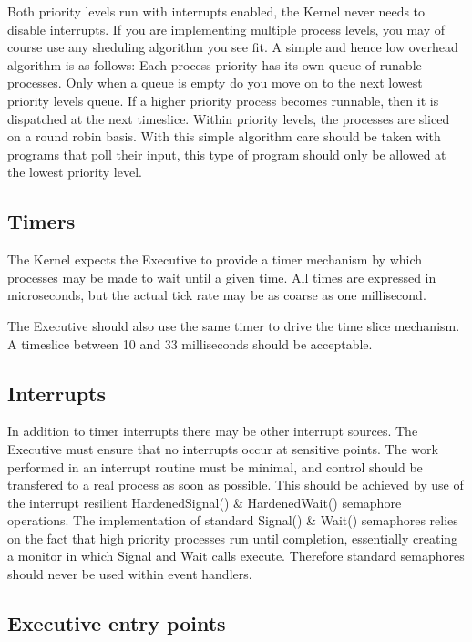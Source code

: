 Both priority levels run with interrupts enabled, the Kernel never
needs to disable interrupts.
If you are implementing multiple process levels, you may of course use
any sheduling algorithm you see fit. A simple and hence low overhead
algorithm is as follows:
Each process priority has its own queue of runable processes. Only when
a queue is empty do you move on to the next lowest priority levels queue.
If a higher priority process becomes runnable, then it is dispatched at
the next timeslice. Within priority levels, the processes are sliced on a
round robin basis.
With this
simple algorithm care should be taken with programs that poll their input,
this type of program should only be allowed at the lowest priority level.

\subsection{Timers}

The Kernel expects the Executive to provide a timer mechanism by which processes
may be made to wait until a given time.
All times are expressed in microseconds, but the actual tick rate may be as 
coarse as one millisecond.

The Executive should also use the same timer to drive the time slice mechanism.
A timeslice between 10 and 33 milliseconds should be acceptable.

\subsection{Interrupts}

In addition to timer interrupts there may be other interrupt sources.
The Executive must ensure that no interrupts occur at sensitive points.
The work performed in an interrupt routine must be minimal, and control should
be transfered to a real process as soon as possible. This should be achieved
by use of the interrupt resilient HardenedSignal() \& HardenedWait() semaphore
operations. The implementation of standard Signal() \& Wait() semaphores
relies on the fact that
high priority processes run until completion, essentially creating a monitor
in which Signal and Wait calls execute. Therefore standard semaphores should
never be used within event handlers.

\subsection{Executive entry points}

